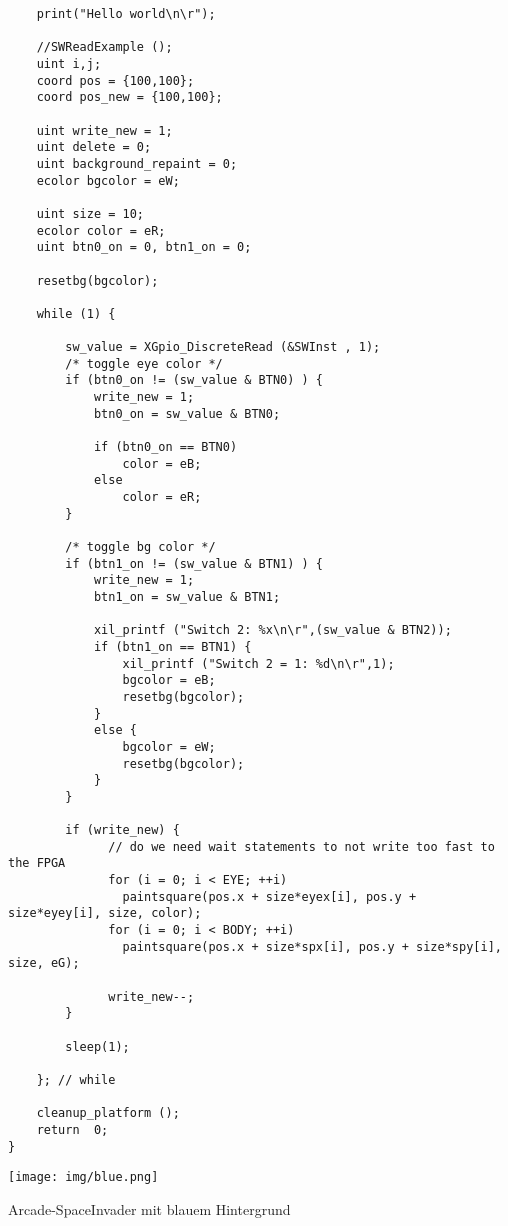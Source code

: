 \begin{verbatim}
	print("Hello world\n\r");

	//SWReadExample ();
	uint i,j;
	coord pos = {100,100};
	coord pos_new = {100,100};
	
	uint write_new = 1;
	uint delete = 0;
	uint background_repaint = 0;
	ecolor bgcolor = eW;

	uint size = 10;
	ecolor color = eR;
	uint btn0_on = 0, btn1_on = 0;

	resetbg(bgcolor);

	while (1) {

		sw_value = XGpio_DiscreteRead (&SWInst , 1);
		/* toggle eye color */
		if (btn0_on != (sw_value & BTN0) ) {
			write_new = 1;
			btn0_on = sw_value & BTN0;

			if (btn0_on == BTN0)
				color = eB;
			else
				color = eR;
		}

		/* toggle bg color */
		if (btn1_on != (sw_value & BTN1) ) {
			write_new = 1;
			btn1_on = sw_value & BTN1;

			xil_printf ("Switch 2: %x\n\r",(sw_value & BTN2));
			if (btn1_on == BTN1) {
				xil_printf ("Switch 2 = 1: %d\n\r",1);
				bgcolor = eB;
				resetbg(bgcolor);
			}
			else {
				bgcolor = eW;
				resetbg(bgcolor);
			}
		}

		if (write_new) {
			  // do we need wait statements to not write too fast to the FPGA
			  for (i = 0; i < EYE; ++i)
			  	paintsquare(pos.x + size*eyex[i], pos.y + size*eyey[i], size, color);
			  for (i = 0; i < BODY; ++i)
			  	paintsquare(pos.x + size*spx[i], pos.y + size*spy[i], size, eG);
			
			  write_new--;
		}
		
		sleep(1);

	}; // while

	cleanup_platform ();
	return  0;
}
\end{verbatim}

\begin{minipage}{\textwidth}
    \begin{center}        
        \texttt{[image: img/blue.png]} 
    \end{center}
\end{minipage}
\begin{center}
Arcade-SpaceInvader mit blauem Hintergrund
\end{center}





